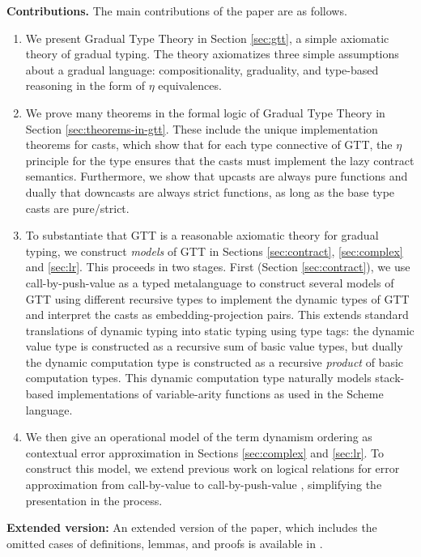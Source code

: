\documentclass[acmsmall,screen,12pt]{acmart}
\begin{document}
\textbf{Contributions.}
The main contributions of the paper are as follows.
\begin{enumerate}
\item We present Gradual Type Theory in Section \ref{sec:gtt}, a simple
  axiomatic theory of gradual typing. The theory axiomatizes three
  simple assumptions about a gradual language: compositionality,
  graduality, and type-based reasoning in the form of $\eta$
  equivalences.
\item We prove many theorems in the formal logic of Gradual Type
  Theory in Section \ref{sec:theorems-in-gtt}. These include the
  unique implementation theorems for casts, which show that for
  each type connective of GTT, the $\eta$ principle for the type
  ensures that the casts must implement the lazy contract
  semantics. Furthermore, we show that upcasts are always pure
  functions and dually that downcasts are always strict functions, as
  long as the base type casts are pure/strict.
\item To substantiate that GTT is a reasonable axiomatic theory for
  gradual typing, we construct \emph{models} of GTT in Sections
  \ref{sec:contract}, \ref{sec:complex} and \ref{sec:lr}.  This proceeds
  in two stages. First (Section \ref{sec:contract}), we use
  call-by-push-value as a typed metalanguage to construct several models
  of GTT using different recursive types to implement the dynamic types
  of GTT and interpret the casts as embedding-projection pairs. This
  extends standard translations of dynamic typing into static typing
  using type tags: the dynamic value type is constructed as a recursive
  sum of basic value types, but dually the dynamic computation type is
  constructed as a recursive \emph{product} of basic computation
  types. This dynamic computation type naturally models stack-based
  implementations of variable-arity functions as used in the Scheme
  language.
\item We then give an operational model of the term dynamism ordering
  as contextual error approximation in Sections \ref{sec:complex} and
  \ref{sec:lr}. To construct this model, we extend previous work on
  logical relations for error approximation from call-by-value to
  call-by-push-value \cite{newahmed18}, simplifying the presentation
  in the process.
\end{enumerate}

\begin{shortonly}
\textbf{Extended version:} An extended version of the paper, which
includes the omitted cases of definitions, lemmas, and proofs is
available in \citet{newlicataahmed19:extended}.
\end{shortonly}
\end{document}
